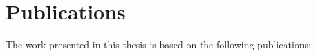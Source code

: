 \chapter{Publications}

The work presented in this thesis is based on the following publications:

\vspace{2cm}





